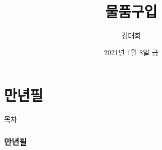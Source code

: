 \documentclass[aspectratio=1610,20pt,xcolor=pdftex,dvipsnames,table,handout]{beamer}
\begin{document}
	

			\title 	{물품구입}
			\author 	{ 김대희 }
			\date 	{ 
					2021년 
					1월 
					8일
					금  
					} 


%
%
%
%
%



		\begin{frame}[plain]
		\titlepage
		\end{frame}




		\part{만년필}
		\frame{\partpage}
		
		\begin{frame} [plain]{목차}
		\tableofcontents%
		\end{frame}

		\section{만년필}
\end{document}
